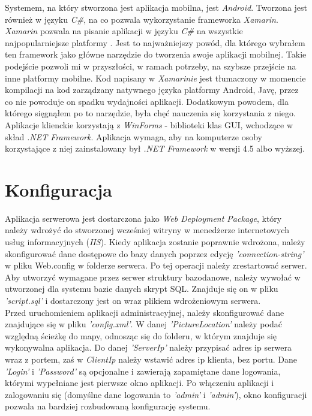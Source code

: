 Systemem, na który stworzona jest aplikacja mobilna, jest \textit{Android}. Tworzona jest również w języku\textit{ C\#}, na co pozwala wykorzystanie frameworka \textit{Xamarin}. \textit{Xamarin} pozwala na pisanie aplikacji w języku\textit{ C\#} na wszystkie najpopularniejsze platformy \cite{XAM}. Jest to najważniejszy powód, dla którego wybrałem ten framework jako główne narzędzie do tworzenia swoje aplikacji mobilnej. Takie podejście pozwoli mi w przyszłości, w ramach potrzeby, na szybsze przejście na inne platformy mobilne. Kod napisany w \textit{Xamarinie} jest tłumaczony w momencie kompilacji na kod zarządzany natywnego języka platformy Android, Javę, przez co nie powoduje on spadku wydajności aplikacji. Dodatkowym powodem, dla którego sięgnąłem po to narzędzie, była chęć nauczenia się korzystania z niego.\\
Aplikacje klienckie korzystają z \textit{WinForms} - biblioteki klas GUI, wchodzące w skład \textit{.NET Framework}. Aplikacja wymaga, aby na komputerze osoby korzystające z niej zainstalowany był \textit{.NET Framework} w wersji 4.5 albo wyższej.
\section{Konfiguracja}
Aplikacja serwerowa jest dostarczona jako \textit{Web Deployment Package}, który należy wdrożyć do stworzonej wcześniej witryny w menedżerze internetowych usług informacyjnych (\textit{IIS}). Kiedy aplikacja zostanie poprawnie wdrożona, należy skonfigurować dane dostępowe do bazy danych poprzez edycję \textit{'connection-string'} w pliku Web.config w folderze serwera. Po tej operacji należy zrestartować serwer.\\
Aby utworzyć wymagane przez serwer struktury bazodanowe, należy wywołać w utworzonej dla systemu bazie danych skrypt SQL. Znajduje się on w pliku \textit{'script.sql'} i dostarczony jest on wraz plikiem wdrożeniowym serwera.\\
Przed uruchomieniem aplikacji administracyjnej, należy skonfigurować dane znajdujące się w pliku \textit{'config.xml'}. W danej \textit{'PictureLocation'} należy podać względną ścieżkę do mapy, odnosząc się do folderu, w którym znajduje się wykonywalna aplikacja. Do danej \textit{'ServerIp'} należy przypisać adres ip serwera wraz z portem, zaś w \textit{ClientIp} należy wstawić adres ip klienta, bez portu. Dane \textit{'Login'} i \textit{'Password'} są opcjonalne i zawierają zapamiętane dane logowania, którymi wypełniane jest pierwsze okno aplikacji. Po włączeniu aplikacji i zalogowaniu się (domyślne dane logowania to \textit{'admin'} i \textit{'admin'}), okno konfiguracji pozwala na bardziej rozbudowaną konfigurację systemu.
